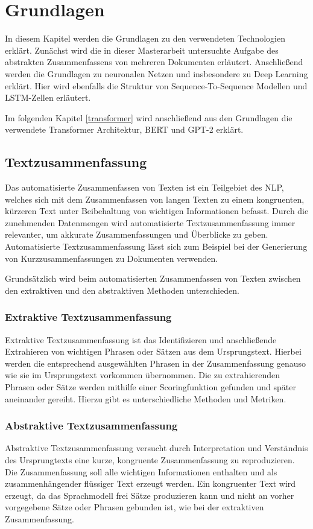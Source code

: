 \section{Grundlagen}\raggedbottom
In diesem Kapitel werden die Grundlagen zu den verwendeten Technologien erklärt. 
Zunächst wird die in dieser Masterarbeit untersuchte Aufgabe des abstrakten Zusammenfassens von mehreren Dokumenten erläutert.
Anschließend werden die Grundlagen zu neuronalen Netzen und insbesondere zu Deep Learning erklärt. 
Hier wird ebenfalls die Struktur von Sequence-To-Sequence Modellen und LSTM-Zellen erläutert.

Im folgenden Kapitel \ref*{transformer} wird anschließend aus den Grundlagen die verwendete Transformer Architektur, BERT und GPT-2 erklärt.


\subsection{Textzusammenfassung}
Das automatisierte Zusammenfassen von Texten ist ein Teilgebiet des NLP, welches sich mit dem Zusammenfassen von langen Texten zu einem kongruenten, kürzeren Text unter Beibehaltung von wichtigen Informationen befasst. 
Durch die zunehmenden Datenmengen wird automatisierte Textzusammenfassung immer relevanter, um akkurate Zusammenfassungen und Überblicke zu geben.
Automatisierte Textzusammenfassung lässt sich zum Beispiel bei der Generierung von Kurzzusammenfassungen zu Dokumenten verwenden.

Grundsätzlich wird beim automatisierten Zusammenfassen von Texten zwischen den extraktiven und den abstraktiven Methoden unterschieden.

\subsubsection{Extraktive Textzusammenfassung}
Extraktive Textzusammenfassung ist das Identifizieren und anschließende Extrahieren von wichtigen Phrasen oder Sätzen aus dem Ursprungstext.
Hierbei werden die entsprechend ausgewählten Phrasen in der Zusammenfassung genauso wie sie im Ursprungstext vorkommen übernommen.
Die zu extrahierenden Phrasen oder Sätze werden mithilfe einer Scoringfunktion gefunden und später aneinander gereiht. Hierzu gibt es unterschiedliche Methoden und Metriken.

\subsubsection{Abstraktive Textzusammenfassung}
Abstraktive Textzusammenfassung versucht durch Interpretation und Verständnis des Ursprungtexts eine kurze, kongruente Zusammenfassung zu reproduzieren. 
Die Zusammenfassung soll alle wichtigen Informationen enthalten und als zusammenhängender flüssiger Text erzeugt werden. Ein kongruenter Text wird erzeugt, da das Sprachmodell frei Sätze produzieren kann und nicht an vorher vorgegebene Sätze oder Phrasen gebunden ist, wie bei der extraktiven Zusammenfassung.

